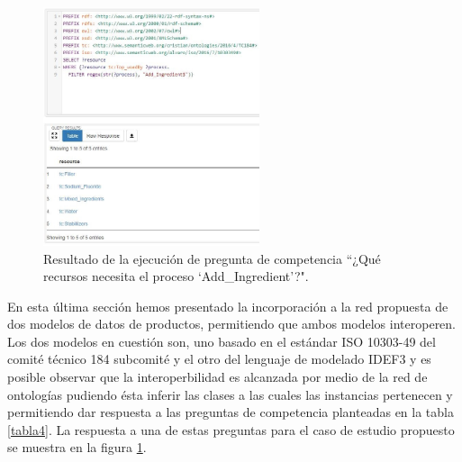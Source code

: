 \documentclass[journal]{IEEEtran}
\begin{document}
\begin{figure}[!t]
\centering
\includegraphics[width=2.5in]{figures/figure13.jpg}
\caption{Resultado de la ejecuci\'on de pregunta de competencia ``¿Qu\'e recursos necesita el proceso ‘Add\_Ingredient’?".}
\label{fig13}
\end{figure}


En esta \'ultima secci\'on hemos presentado la incorporación a la red propuesta de dos modelos de datos de productos, permitiendo que ambos modelos interoperen. Los dos modelos en cuesti\'on son, uno basado en el est\'andar ISO 10303-49 del comit\'e t\'ecnico 184 subcomit\'e y el otro del lenguaje de modelado IDEF3 y es posible observar que  la interoperbilidad es alcanzada por medio de la red de ontolog\'ias pudiendo \'esta inferir las clases a las cuales las instancias pertenecen y permitiendo dar respuesta a las preguntas de competencia planteadas en la tabla \ref{tabla4}. La respuesta a una de estas preguntas para el caso de estudio propuesto se muestra en la figura \ref{fig13}.

%
%
\end{document}
